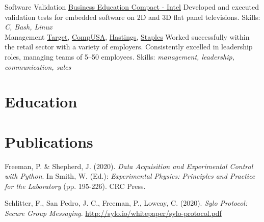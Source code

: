 \documentclass[a4paper]{twentysecondcv}
\begin{document}
\begin{twenty}
           {}
           {Software Validation}
           {\href{https://www.becpdx.org/}{Business Education Compact - Intel}}
           {}
           {Developed and executed validation tests for embedded software on 2D
           and 3D flat panel televisions.
           Skills: \emph{C, Bash, Linux}} \\

           {}
           {Management}
           {\href{https://www.target.com/}{Target},
           \href{https://en.wikipedia.org/wiki/CompUSA}{CompUSA},
           \href{https://en.wikipedia.org/wiki/Hastings\_Entertainment}{Hastings},
           \href{https://www.staples.com/}{Staples}}
           {}
           {Worked
           successfully within the retail sector with a variety of employers.
           Consistently excelled in leadership roles, managing teams of 5--50
           employees.
           Skills: \emph{management, leadership, communication, sales}}

\end{twenty}

\section{Education}
\begin{twenty}
\end{twenty}

\section{Publications}

Freeman, P. \& Shepherd, J. (2020). \emph{Data Acquisition and Experimental
Control with Python}. In Smith, W. (Ed.): \emph{Experimental Physics: Principles and Practice for the
Laboratory} (pp. 195-226). CRC Press.

Schlitter, F., San Pedro, J. C., Freeman, P., Lowcay, C. (2020). \emph{Sylo
Protocol: Secure Group Messaging}. \href{http://sylo.io/whitepaper/sylo-protocol.pdf}{http://sylo.io/whitepaper/sylo-protocol.pdf}
\end{document}

